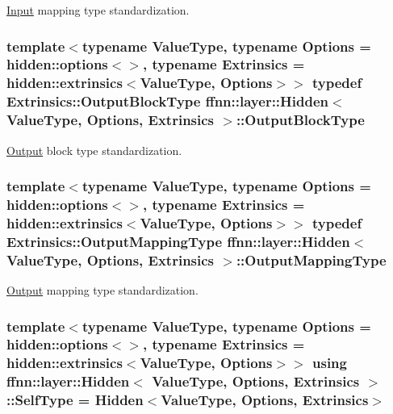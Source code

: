 \hyperlink{classffnn_1_1layer_1_1_input}{Input} mapping type standardization. 

\hypertarget{classffnn_1_1layer_1_1_hidden_a9fd326932b57e1d86d86bdb168822727}{
\subsubsection[{Output\-Block\-Type}]{\setlength{\rightskip}{0pt plus 5cm}template$<$typename Value\-Type, typename Options = hidden\-::options$<$$>$, typename Extrinsics = hidden\-::extrinsics$<$\-Value\-Type, Options$>$$>$ typedef Extrinsics\-::\-Output\-Block\-Type {\bf ffnn\-::layer\-::\-Hidden}$<$ Value\-Type, Options, Extrinsics $>$\-::{\bf Output\-Block\-Type}}}\label{classffnn_1_1layer_1_1_hidden_a9fd326932b57e1d86d86bdb168822727}


\hyperlink{classffnn_1_1layer_1_1_output}{Output} block type standardization. 

\hypertarget{classffnn_1_1layer_1_1_hidden_a9d882e035c7cd80ccd9b58fbe832591e}{
\subsubsection[{Output\-Mapping\-Type}]{\setlength{\rightskip}{0pt plus 5cm}template$<$typename Value\-Type, typename Options = hidden\-::options$<$$>$, typename Extrinsics = hidden\-::extrinsics$<$\-Value\-Type, Options$>$$>$ typedef Extrinsics\-::\-Output\-Mapping\-Type {\bf ffnn\-::layer\-::\-Hidden}$<$ Value\-Type, Options, Extrinsics $>$\-::{\bf Output\-Mapping\-Type}}}\label{classffnn_1_1layer_1_1_hidden_a9d882e035c7cd80ccd9b58fbe832591e}


\hyperlink{classffnn_1_1layer_1_1_output}{Output} mapping type standardization. 

\hypertarget{classffnn_1_1layer_1_1_hidden_a27c65759b388a6312329cf610d4fa4a3}{
\subsubsection[{Self\-Type}]{\setlength{\rightskip}{0pt plus 5cm}template$<$typename Value\-Type, typename Options = hidden\-::options$<$$>$, typename Extrinsics = hidden\-::extrinsics$<$\-Value\-Type, Options$>$$>$ using {\bf ffnn\-::layer\-::\-Hidden}$<$ Value\-Type, Options, Extrinsics $>$\-::{\bf Self\-Type} =  {\bf Hidden}$<$Value\-Type, Options, Extrinsics$>$}}\label{classffnn_1_1layer_1_1_hidden_a27c65759b388a6312329cf610d4fa4a3}


